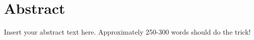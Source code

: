 \chapter*{Abstract}
Insert your abstract text here.  Approximately 250-300 words should do the trick!